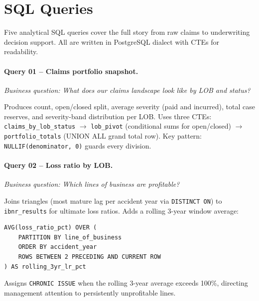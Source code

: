 \section{SQL Queries}
\label{sec:ins-sql}


Five analytical SQL queries cover the full story from raw claims to
underwriting decision support.  All are written in PostgreSQL dialect with
CTEs for readability.

\paragraph{Query 01 -- Claims portfolio snapshot.}
\emph{Business question: What does our claims landscape look like by LOB and status?}

Produces count, open/closed split, average severity (paid and incurred),
total case reserves, and severity-band distribution per LOB.
Uses three CTEs: \texttt{claims\_by\_lob\_status} $\to$
\texttt{lob\_pivot} (conditional sums for open/closed) $\to$
\texttt{portfolio\_totals} (UNION ALL grand total row).
Key pattern: \texttt{NULLIF(denominator, 0)} guards every division.

\paragraph{Query 02 -- Loss ratio by LOB.}
\emph{Business question: Which lines of business are profitable?}

Joins triangles (most mature lag per accident year via \texttt{DISTINCT ON})
to \texttt{ibnr\_results} for ultimate loss ratios.  Adds a rolling 3-year
window average:

\begin{lstlisting}[style=sql, caption={Rolling window loss ratio (\texttt{02\_loss\_ratio\_by\_lob.sql})}]
AVG(loss_ratio_pct) OVER (
    PARTITION BY line_of_business
    ORDER BY accident_year
    ROWS BETWEEN 2 PRECEDING AND CURRENT ROW
) AS rolling_3yr_lr_pct
\end{lstlisting}

Assigns \texttt{CHRONIC ISSUE} when the rolling 3-year average exceeds 100\%,
directing management attention to persistently unprofitable lines.

